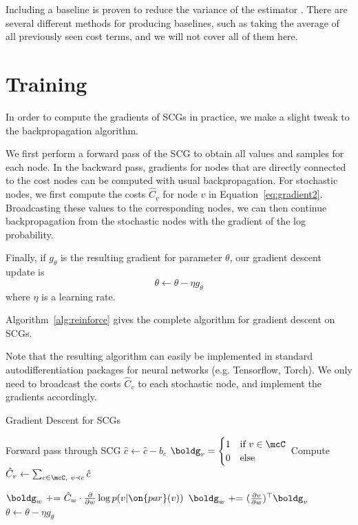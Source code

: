 \documentclass[12pt]{report}
\begin{document}
Including a baseline is proven to reduce the variance of the estimator \citep{Weaver2001}. There are several different methods for producing baselines, such as taking the average of all previously seen cost terms, and we will not cover all of them here.

\section{Training}
\label{sec:algorithm}

In order to compute the gradients of SCGs in practice, we make a slight tweak to the backpropagation algorithm.

We first perform a forward pass of the SCG to obtain all values and samples for each node. In the backward pass, gradients for nodes that are directly connected to the cost nodes can be computed with usual backpropagation. For stochastic nodes, we first compute the costs $\hat{C}_v$ for node $v$ in Equation~\ref{eq:gradient2}. Broadcasting these values to the corresponding nodes, we can then continue backpropagation from the stochastic nodes with the gradient of the log probability.

Finally, if $g_\theta$ is the resulting gradient for parameter $\theta$, our gradient descent update is
\begin{equation}
\theta \gets \theta  - \eta g_\theta
\end{equation}
where $\eta$ is a learning rate.

Algorithm~\ref{alg:reinforce} gives the complete algorithm for gradient descent on SCGs.

Note that the resulting algorithm can easily be implemented in standard autodifferentiation packages for neural networks (e.g. Tensorflow, Torch). We only need to broadcast the costs $\hat{C}_v$ to each stochastic node, and implement the gradients accordingly.



\begin{algorithm}[t]
\caption{Gradient Descent for SCGs}
\label{alg:reinforce}
\begin{algorithmic}
\State Forward pass through SCG
\State $\hat{c} \gets \hat{c} - b_c$ 
\EndFor
{}
\State $\boldg_v = \begin{cases} 1 & \text{if $v \in \mcC$} \\ 0 & \text{else} \end{cases}$
\State Compute $\hat{C}_v \gets \sum_{c \in \mcC, ~v \prec c} \hat{c}$ 
\EndFor

 
	\State $\boldg_w \text{ += } \hat{C}_w \cdot \frac{\partial}{\partial w} \log p(v | \on{par}(v) ) $
\Else
	\State $\boldg_w \text{ += } (\frac{\partial v}{\partial w})^\top \boldg_v$
\EndIf
\EndIf
\EndFor
\EndFor
{}
\State $\theta \gets \theta - \eta g_\theta$ 
\EndFor
\end{algorithmic}
\end{algorithm}
\end{document}
